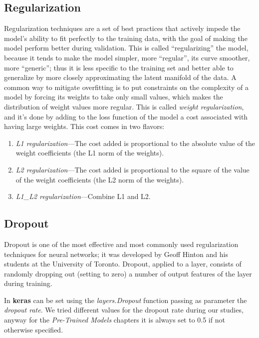 \subsection{Regularization}
Regularization techniques are a set of best practices that actively impede the model’s ability to fit perfectly to the training data, with the goal of making the model perform better during validation. This is called “regularizing” the model, because it tends to make the model simpler, more “regular”, its curve smoother, more “generic”; thus it is less specific to the training set and better able to generalize by more closely approximating the latent manifold of the data.
A common way to mitigate overfitting is to put constraints on the complexity of a model by forcing its weights to take only small values, which makes the distribution of weight values more regular. This is called \textit{weight regularization}, and it’s done by adding to the loss function of the model a cost associated with having large weights. This cost comes in two flavors:
\begin{enumerate}
\item \textit{L1 regularization}—The cost added is proportional to the absolute value of the weight coefficients (the L1 norm of the weights).
\item \textit{L2 regularization}—The cost added is proportional to the square of the value of the weight coefficients (the L2 norm of the weights).
\item \textit{L1\_L2 regularization}—Combine L1 and L2.
\end{enumerate}

\subsection{Dropout}
Dropout is one of the most effective and most commonly used regularization techniques for neural networks; it was developed by Geoff Hinton and his students at the University of Toronto. Dropout, applied to a layer, consists of randomly dropping out (setting to zero) a number of output features of the layer during training.

In \textbf{keras} can be set using the \textit{layers.Dropout} function passing as parameter the \textit{dropout rate}. We tried different values for the dropout rate during our studies, anyway for the \textit{Pre-Trained Models} chapters it is always set to 0.5 if not otherwise specified.

